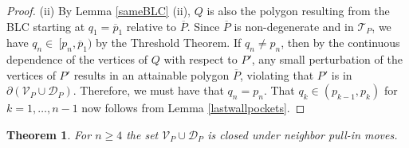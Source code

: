 \documentclass[11pt]{amsart}
\newtheorem{theorem}{Theorem}[section]
\theoremstyle{remark}
\numberwithin{equation}{section}
\newcommand{\D}{\mathcal{D}}
\newcommand{\TT}{\mathcal{T}}
\newcommand{\V}{\mathcal{V}}
\renewcommand{\geq}{\geqslant}
\begin{document}
\begin{proof}
(ii)  By Lemma \ref{sameBLC} (ii), $Q$ is also the polygon resulting from the BLC starting at $q_1=\overline p_1$ relative to $\overline P$. Since $\overline P$ is non-degenerate and in $\TT_P$, we have $q_n\in\ [p_n,\overline p_1)$ by the Threshold Theorem. If $q_n\neq p_{n}$, then by the continuous dependence of the vertices of $Q$ with respect to $P'$, any small perturbation of the vertices of $P'$ results in an attainable polygon $\overline P$, violating that $P'$ is in $\partial (\V_P\cup\D_P)$. Therefore, we must have that $q_n=p_n$. That $q_k\in (p_{k-1},p_k)$ for $k=1,\ldots,n-1$ now follows from Lemma \ref{lastwallpockets}.
\end{proof}




\begin{theorem}\label{closedundermoves}
For $n\geq 4$ the set $\V_P\cup \D_P$ is closed under neighbor pull-in moves.
\end{theorem}
\end{document}

